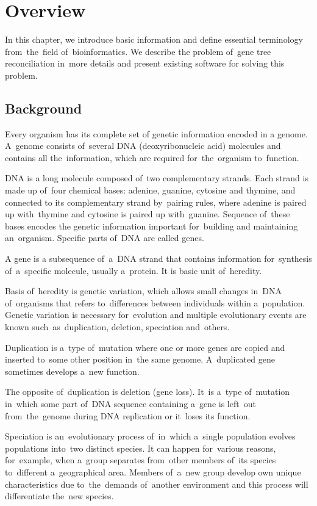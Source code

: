 \chapter{Overview}
In this chapter, we introduce basic information and define essential terminology from~the~field of~bioinformatics. We describe the problem of~gene tree reconciliation in~more details and present existing software for solving this problem.

\section{Background}
Every organism has its complete set of genetic information encoded in a genome. A~genome consists of~several DNA (deoxyribonucleic acid) molecules and contains all the~information, which are required for~the~organism to~function.

DNA is a long molecule composed of~two complementary strands. Each strand is made up of~four chemical bases: adenine, guanine, cytosine and thymine, and connected to its complementary strand by~pairing rules, where adenine is paired up with~thymine and cytosine is paired up with~guanine. Sequence of~these bases encodes the genetic information important for~building and maintaining an~organism. Specific parts of~DNA are called genes.

A gene is a subsequence of~a~DNA strand that contains information for~synthesis of~a~specific molecule, usually a~protein. It is basic unit of~heredity.

Basis of~heredity is genetic variation, which allows small changes in~DNA of~organisms that refers to~differences between individuals within a~population. Genetic variation is necessary for~evolution and multiple evolutionary events are known such~as~duplication, deletion, speciation and~others.

Duplication is a~type of~mutation where one or more genes are copied and inserted to~some other position in~the same genome. A~duplicated gene sometimes develops a~new function. \cite{doyon}

The opposite of~duplication is deletion (gene loss). It~is a~type of~mutation in~which some part of~DNA sequence containing a~gene is left~out from~the~genome during DNA replication or it~loses its function. 

Speciation is an~evolutionary process of~in~which a~single population evolves populations into~two distinct species. It can happen for~various reasons, for~example, when a~group separates from~other members of~its species to~different a~geographical area. Members of~a~new group develop own unique characteristics due to~the~demands of~another environment and this process will differentiate the~new species.

